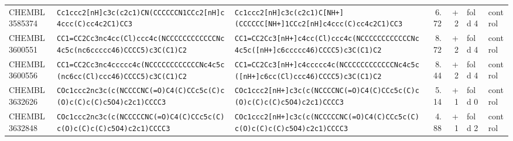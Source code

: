 \begin{longtable}{l p{4.4cm} p{4.4cm} r r l l}
CHEMBL3585374 & \texttt{Cc1ccc2[nH]\allowbreak{}c3c(\allowbreak{}c2c1)\allowbreak{}CN(\allowbreak{}CCCCCCN1CCc2[nH]\allowbreak{}c4ccc(\allowbreak{}C)\allowbreak{}cc4c2C1)\allowbreak{}CC3} & \texttt{Cc1ccc2[nH]\allowbreak{}c3c(\allowbreak{}c2c1)\allowbreak{}C[NH+]\allowbreak{}(\allowbreak{}CCCCCC[NH+]\allowbreak{}1CCc2[nH]\allowbreak{}c4ccc(\allowbreak{}C)\allowbreak{}cc4c2C1)\allowbreak{}CC3} & 6.72 & +2 & fold 4 & control \\
CHEMBL3600551 & \texttt{CC1=\allowbreak{}CC2Cc3nc4cc(\allowbreak{}Cl)\allowbreak{}ccc4c(\allowbreak{}NCCCCCCCCCCCCNc4c5c(\allowbreak{}nc6ccccc46)\allowbreak{}CCCC5)\allowbreak{}c3C(\allowbreak{}C1)\allowbreak{}C2} & \texttt{CC1=\allowbreak{}CC2Cc3[nH+]\allowbreak{}c4cc(\allowbreak{}Cl)\allowbreak{}ccc4c(\allowbreak{}NCCCCCCCCCCCCNc4c5c(\allowbreak{}[nH+]\allowbreak{}c6ccccc46)\allowbreak{}CCCC5)\allowbreak{}c3C(\allowbreak{}C1)\allowbreak{}C2} & 8.72 & +2 & fold 4 & control \\
CHEMBL3600556 & \texttt{CC1=\allowbreak{}CC2Cc3nc4ccccc4c(\allowbreak{}NCCCCCCCCCCCCNc4c5c(\allowbreak{}nc6cc(\allowbreak{}Cl)\allowbreak{}ccc46)\allowbreak{}CCCC5)\allowbreak{}c3C(\allowbreak{}C1)\allowbreak{}C2} & \texttt{CC1=\allowbreak{}CC2Cc3[nH+]\allowbreak{}c4ccccc4c(\allowbreak{}NCCCCCCCCCCCCNc4c5c(\allowbreak{}[nH+]\allowbreak{}c6cc(\allowbreak{}Cl)\allowbreak{}ccc46)\allowbreak{}CCCC5)\allowbreak{}c3C(\allowbreak{}C1)\allowbreak{}C2} & 8.44 & +2 & fold 4 & control \\
CHEMBL3632626 & \texttt{COc1ccc2nc3c(\allowbreak{}c(\allowbreak{}NCCCCNC(\allowbreak{}=\allowbreak{}O)\allowbreak{}C4(\allowbreak{}C)\allowbreak{}CCc5c(\allowbreak{}C)\allowbreak{}c(\allowbreak{}O)\allowbreak{}c(\allowbreak{}C)\allowbreak{}c(\allowbreak{}C)\allowbreak{}c5O4)\allowbreak{}c2c1)\allowbreak{}CCCC3} & \texttt{COc1ccc2[nH+]\allowbreak{}c3c(\allowbreak{}c(\allowbreak{}NCCCCNC(\allowbreak{}=\allowbreak{}O)\allowbreak{}C4(\allowbreak{}C)\allowbreak{}CCc5c(\allowbreak{}C)\allowbreak{}c(\allowbreak{}O)\allowbreak{}c(\allowbreak{}C)\allowbreak{}c(\allowbreak{}C)\allowbreak{}c5O4)\allowbreak{}c2c1)\allowbreak{}CCCC3} & 5.14 & +1 & fold 0 & control \\
CHEMBL3632848 & \texttt{COc1ccc2nc3c(\allowbreak{}c(\allowbreak{}NCCCCCNC(\allowbreak{}=\allowbreak{}O)\allowbreak{}C4(\allowbreak{}C)\allowbreak{}CCc5c(\allowbreak{}C)\allowbreak{}c(\allowbreak{}O)\allowbreak{}c(\allowbreak{}C)\allowbreak{}c(\allowbreak{}C)\allowbreak{}c5O4)\allowbreak{}c2c1)\allowbreak{}CCCC3} & \texttt{COc1ccc2[nH+]\allowbreak{}c3c(\allowbreak{}c(\allowbreak{}NCCCCCNC(\allowbreak{}=\allowbreak{}O)\allowbreak{}C4(\allowbreak{}C)\allowbreak{}CCc5c(\allowbreak{}C)\allowbreak{}c(\allowbreak{}O)\allowbreak{}c(\allowbreak{}C)\allowbreak{}c(\allowbreak{}C)\allowbreak{}c5O4)\allowbreak{}c2c1)\allowbreak{}CCCC3} & 4.88 & +1 & fold 2 & control \\

\end{longtable}
